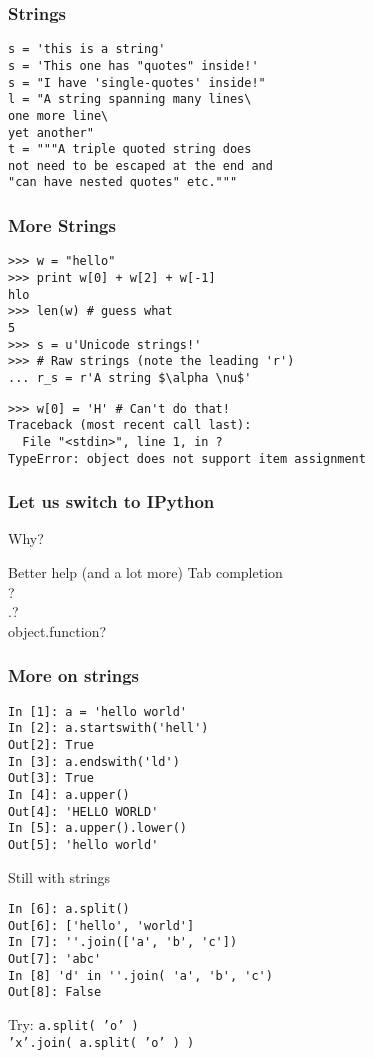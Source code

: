 \documentclass[14pt,compress]{beamer}
\begin{document}
\begin{frame}[fragile]
  \frametitle{Strings}
  \begin{lstlisting}
s = 'this is a string'
s = 'This one has "quotes" inside!'
s = "I have 'single-quotes' inside!"
l = "A string spanning many lines\
one more line\
yet another"
t = """A triple quoted string does
not need to be escaped at the end and 
"can have nested quotes" etc."""
  \end{lstlisting}
\end{frame}

\begin{frame}[fragile]
  \frametitle{More Strings}
  \vspace*{-0.2in}
  \begin{lstlisting}
>>> w = "hello"    
>>> print w[0] + w[2] + w[-1]
hlo
>>> len(w) # guess what
5
>>> s = u'Unicode strings!'
>>> # Raw strings (note the leading 'r')
... r_s = r'A string $\alpha \nu$'
  \end{lstlisting}
\pause
  \begin{lstlisting}
>>> w[0] = 'H' # Can't do that!
Traceback (most recent call last):
  File "<stdin>", line 1, in ?
TypeError: object does not support item assignment
  \end{lstlisting}
\end{frame}

\begin{frame}
  \frametitle{Let us switch to IPython}
  Why?
  \begin{block}
    {Better help (and a lot more)}
    Tab completion\\
    ?\\
    .?\\
    object.function?
  \end{block}
\end{frame}

\begin{frame}[fragile]
  \frametitle{More on strings}
  \begin{lstlisting}
In [1]: a = 'hello world'
In [2]: a.startswith('hell')
Out[2]: True
In [3]: a.endswith('ld')
Out[3]: True
In [4]: a.upper()
Out[4]: 'HELLO WORLD'
In [5]: a.upper().lower()
Out[5]: 'hello world'
  \end{lstlisting}
\end{frame}

\begin{frame}[fragile]{Still with strings}
  \begin{lstlisting}
In [6]: a.split()
Out[6]: ['hello', 'world']
In [7]: ''.join(['a', 'b', 'c'])
Out[7]: 'abc'
In [8] 'd' in ''.join( 'a', 'b', 'c')
Out[8]: False
  \end{lstlisting}
  \begin{block}{Try:}
    \texttt{a.split( 'o' )}\\
    \texttt{'x'.join( a.split( 'o' ) )}
  \end{block}
\end{frame}
\end{document}
